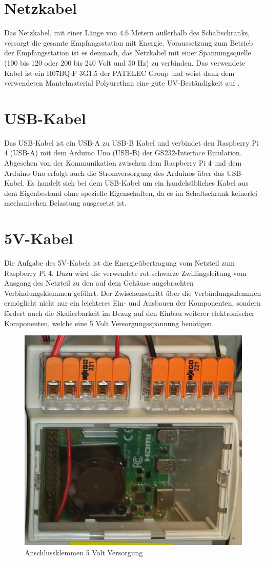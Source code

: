 \section{Netzkabel}
\label{sec:Netzkabel}
Das Netzkabel, mit einer Länge von 4.6 Metern außerhalb des Schaltschranks, versorgt die gesamte Empfangsstation mit Energie. Voraussetzung zum Betrieb der Empfangsstation ist es demnach, das Netzkabel mit einer Spannungsquelle (100 bis 120 oder 200 bis 240 Volt und 50 Hz) zu verbinden. Das verwendete Kabel ist ein H07BQ-F 3G1.5 der PATELEC Group \cite{noauthor_cables_nodate} und weist dank dem verwendeten Mantelmaterial Polyurethan eine gute UV-Beständigkeit auf \cite{noauthor_polyurethan_nodate}.

\section{USB-Kabel}
\label{sec:USB-Kabel}
Das USB-Kabel ist ein USB-A zu USB-B Kabel und verbindet den Raspberry Pi 4 (USB-A) mit dem Arduino Uno (USB-B) der GS232-Interface Emulation. Abgesehen von der Kommunikation zwischen dem Raspberry Pi 4 und dem Arduino Uno erfolgt auch die Stromversorgung des Arduinos über das USB-Kabel. Es handelt sich bei dem USB-Kabel um ein handelsübliches Kabel aus dem Eigenbestand ohne spezielle Eigenschaften, da es im Schaltschrank keinerlei mechanischen Belastung ausgesetzt ist.

\section{5V-Kabel}
\label{sec:5V-Kabel}
Die Aufgabe des 5V-Kabels ist die Energieübertragung vom Netzteil zum Raspberry Pi 4. Dazu wird die verwendete rot-schwarze Zwillingsleitung vom Ausgang des Netzteil zu den auf dem Gehäuse angebrachten Verbindungsklemmen geführt. Der Zwischenschritt über die Verbindungsklemmen ermöglicht nicht nur ein leichteres Ein- und Ausbauen der Komponenten, sondern fördert auch die Skalierbarkeit im Bezug auf den Einbau weiterer elektronischer Komponenten, welche eine 5 Volt Versorgungsspannung benötigen.

\begin{figure}[H]
	\centering
	\includegraphics[width=.25\linewidth]{../ref/Anschlussklemmen5V.jpeg}
	\caption{Anschlussklemmen 5 Volt Versorgung}
	\label{fig:anschlussklemmen}
\end{figure}

